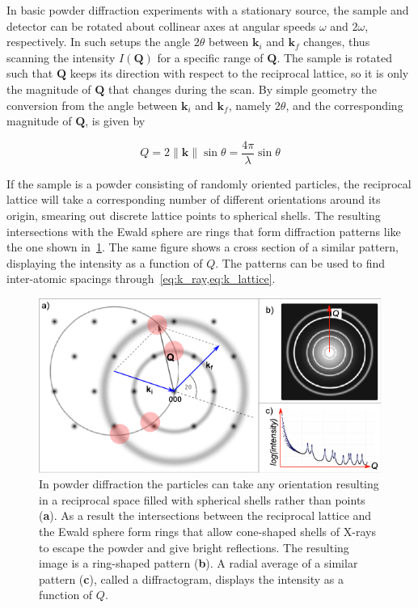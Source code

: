\documentclass[11pt,twoside]{report}
\begin{document}
\indent In basic powder diffraction experiments with a stationary source, the sample and detector can be rotated about collinear axes at angular speeds $\omega$ and $2\omega$, respectively. In such setups  the angle $2\theta$ between ${\mathbf k}_{i}$ and ${\mathbf k}_{f}$  changes, thus scanning the intensity $I({\mathbf Q})$ for a specific range of ${\mathbf Q}$. The sample is rotated  such that ${\mathbf Q}$ keeps its direction with respect to the reciprocal lattice, so it is only the magnitude of ${\mathbf Q}$ that changes during the scan. By simple geometry the conversion from the angle between ${\mathbf k}_{i}$ and ${\mathbf k}_{f}$, namely $2\theta$, and the corresponding magnitude of ${\mathbf Q}$, is given by

\begin{equation}
Q = 2\|{\mathbf k}\|\sin{\theta}  = \frac{4\pi}{\lambda}\sin{\theta} 
\label{eq:thetatoq}
\end{equation} 

\indent If the sample is a powder consisting of randomly oriented particles, the reciprocal lattice will take a corresponding number of  different orientations around its origin, smearing out discrete lattice points to spherical shells. The resulting intersections with the Ewald sphere are rings that form diffraction patterns like the one shown in~\cref{fig:scattering_powder}. The same figure shows a cross section of a similar pattern,  displaying the intensity as a function of $Q$. The patterns can be used   to find inter-atomic spacings through~\cref{eq:k_ray,eq:k_lattice}.

\begin{figure}[htbp]
	\vspace{-10pt}
	\begin{center}
		\includegraphics[width=\textwidth]{img/scattering_powder.pdf}	
	\end{center}
	\vspace{-10pt}
	\caption{In powder diffraction the particles can take any orientation resulting in a reciprocal space filled with spherical shells rather than points ({\bf a}). As a result the intersections between the reciprocal lattice and the Ewald sphere form rings that allow cone-shaped shells of X-rays to escape the powder and give bright reflections. The resulting image is a ring-shaped pattern ({\bf b}). A radial average of a similar pattern ({\bf c}), called a diffractogram, displays the intensity as a function of $Q$.\label{fig:scattering_powder}}
\end{figure}
\end{document}
